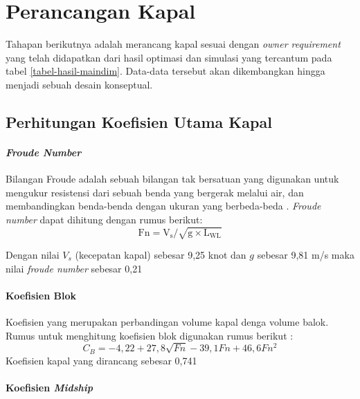 \section{Perancangan Kapal}
\label{sec:last-perancangan-kapal}

Tahapan berikutnya adalah merancang kapal sesuai dengan \emph{owner requirement} yang telah didapatkan dari hasil optimasi dan simulasi yang tercantum pada tabel \ref{tabel-hasil-maindim}. Data-data tersebut akan dikembangkan hingga menjadi sebuah desain konseptual.

\subsection{Perhitungan Koefisien Utama Kapal}
\label{subsec:perhitungan-koefisien}

\paragraph{\emph{Froude Number}}

Bilangan Froude adalah sebuah bilangan tak bersatuan yang digunakan untuk mengukur resistensi dari sebuah benda yang bergerak melalui air, dan membandingkan benda-benda dengan ukuran yang berbeda-beda \citep{Lewis_Engineers_1988}. \emph{Froude number} dapat dihitung dengan rumus berikut:
\begin{equation}
    \mathrm{Fn}=\mathrm{V_s}/\sqrt{\mathrm{g} \times \mathrm{L_{WL}}}
\end{equation}

Dengan nilai $V_s$ (kecepatan kapal) sebesar 9,25 knot dan $g$ sebesar 9,81 m/s maka nilai \emph{froude number} sebesar 0,21

\paragraph{Koefisien Blok}

Koefisien yang merupakan perbandingan volume kapal denga volume balok. Rumus untuk menghitung koefisien blok digunakan rumus berikut \citep{Parsons_2001}:
\begin{equation}
    C_B = -4,22 + 27,8 \sqrt{Fn} -39,1Fn + 46,6 Fn^2
\end{equation}
Koefisien kapal yang dirancang sebesar 0,741
 
\paragraph{Koefisien \emph{Midship}}

